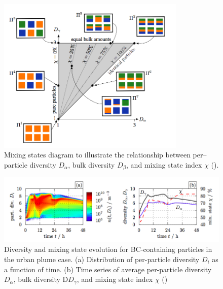 \documentclass[12pt, fullpage]{uiucthesis2009}
\begin{document}
	 \begin{figure}[h] 
	 	\begin{center}
	 		\includegraphics[width = 0.8\textwidth]{Figure28}
	 		\caption[Mixing states diagram to illustrate the relationship between per--particle diversity $D_{\alpha}$, bulk diversity $D_{\beta}$, and mixing state index $\chi$ (\cite{Riemer2013})]{\label{fig_P28} Mixing states diagram to illustrate the relationship between per--particle diversity $D_{\alpha}$, bulk diversity $D_{\beta}$, and mixing state index $\chi$ (\cite{Riemer2013}).}
	 	\end{center}
	 \end{figure}
	
	\begin{figure}[h] 
		\begin{center}
			\includegraphics[width = 1\textwidth]{Figure06}
			\caption[Diversity and mixing state evolution for BC-containing particles in the urban plume case. (a) Distribution of per-particle diversity $D_{i}$ as a function of time. (b) Time series of average per-particle diversity $D_{\alpha}$, bulk diversity D$D_{\gamma}$, and mixing state index $\chi$ (\cite{Riemer2013})]{\label{fig_P6} Diversity and mixing state evolution for BC-containing particles in the urban plume case. (a) Distribution of per-particle diversity $D_{i}$ as a function of time. (b) Time series of average per-particle diversity $D_{\alpha}$, bulk diversity D$D_{\gamma}$, and mixing state index $\chi$ (\cite{Riemer2013})}
		\end{center}
	\end{figure}
	
\end{document}
